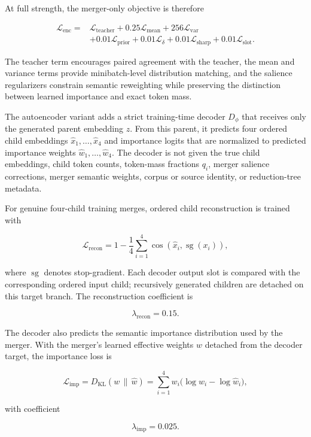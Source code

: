 \documentclass[10pt]{article}
\begin{document}
At full strength, the merger-only objective is therefore

\[
\begin{aligned}
\mathcal{L}_{\mathrm{enc}}
={}&
\mathcal{L}_{\mathrm{teacher}}
+0.25\mathcal{L}_{\mathrm{mean}}
+256\mathcal{L}_{\mathrm{var}}\\
&+0.01\mathcal{L}_{\mathrm{prior}}
+0.01\mathcal{L}_{\delta}
+0.01\mathcal{L}_{\mathrm{sharp}}
+0.01\mathcal{L}_{\mathrm{slot}}.
\end{aligned}
\]

The teacher term encourages paired agreement with the teacher, the mean and variance terms provide minibatch-level distribution matching, and the salience regularizers constrain semantic reweighting while preserving the distinction between learned importance and exact token mass.

The autoencoder variant adds a strict training-time decoder \(D_\phi\) that receives only the generated parent embedding \(z\). From this parent, it predicts four ordered child embeddings \(\hat{x}_1,\ldots,\hat{x}_4\) and importance logits that are normalized to predicted importance weights \(\hat{w}_1,\ldots,\hat{w}_4\). The decoder is not given the true child embeddings, child token counts, token-mass fractions \(q_i\), merger salience corrections, merger semantic weights, corpus or source identity, or reduction-tree metadata.

For genuine four-child training merges, ordered child reconstruction is trained with

\[
\mathcal{L}_{\mathrm{recon}}
=
1-\frac{1}{4}
\sum_{i=1}^{4}
\operatorname{cos}(\hat{x}_i,\operatorname{sg}(x_i)),
\]

where \(\operatorname{sg}\) denotes stop-gradient. Each decoder output slot
is compared with the corresponding ordered input child; recursively generated
children are detached on this target branch. The reconstruction coefficient is

\[
\lambda_{\mathrm{recon}}=0.15.
\]

The decoder also predicts the semantic importance distribution used by the merger. With the merger's learned effective weights \(w\) detached from the decoder target, the importance loss is

\[
\mathcal{L}_{\mathrm{imp}}
=
D_{\mathrm{KL}}(w\,\|\,\hat{w})
=
\sum_{i=1}^{4}
w_i\bigl(\log w_i-\log \hat{w}_i\bigr),
\]

with coefficient

\[
\lambda_{\mathrm{imp}}=0.025.
\]
\end{document}
